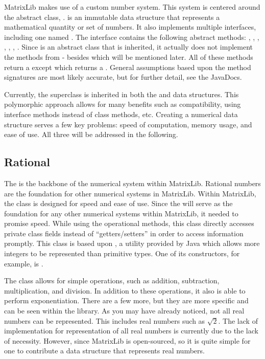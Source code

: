 MatrixLib makes use of a custom number system.
This system is centered around the abstract class, .
 is an immutable data structure that represents a mathematical quantity or set of numbers.
It also implements multiple interfaces, including one named .
The  interface contains the following abstract methods:
, , ,
, , , .
Since  is an abstract class that is inherited,
it actually does not implement the methods from  - besides  which will be mentioned later.
All of these methods return a  except  which returns a .
General assumptions based upon the method signatures are most likely accurate, but for further detail, see the JavaDocs.

Currently, the  superclass is inherited in both the  and  data structures.
This polymorphic approach allows for many benefits such as compatibility, using interface methods instead of class methods, etc.
Creating a numerical data structure serves a few key problems: speed of computation, memory usage, and ease of use.
All three will be addressed in the following.

\subsection*{Rational}
The  is the backbone of the numerical system within MatrixLib.
Rational numbers are the foundation for other numerical systems in MatrixLib.
Within MatrixLib, the  class is designed for speed and ease of use.
Since the  will serve as the foundation for any other numerical systems within MatrixLib, it needed to promise speed.
While using the operational methods, this class directly accesses private class fields instead of ``getters/setters'' in order to access information promptly.
This class is based upon , a utility provided by Java which allows more integers to be represented than primitive types.
One of its constructors, for example, is .

The  class allows for simple operations, such as addition, subtraction, multiplication, and division.
In addition to these operations, it also is able to perform exponentiation.
There are a few more, but they are more specific and can be seen within the library.
As you may have already noticed, not all real numbers can be represented.
This includes real numbers such as $\sqrt{2}$.
The lack of implementation for representation of all real numbers is currently due to the lack of necessity.
However, since MatrixLib is open-sourced, so it is quite simple for one to contribute a data structure that represents real numbers.

